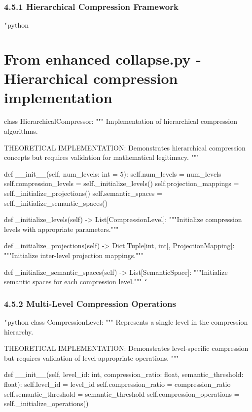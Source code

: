 \subsection{4.5.1 Hierarchical Compression Framework}

\texttt{`}python
\chapter{From enhanced collapse.py - Hierarchical compression implementation}
class HierarchicalCompressor:
    """
    Implementation of hierarchical compression algorithms.
    
    THEORETICAL IMPLEMENTATION: Demonstrates hierarchical compression
    concepts but requires validation for mathematical legitimacy.
    """
    
    def __init__(self, num_levels: int = 5):
        self.num_levels = num_levels
        self.compression_levels = self._initialize_levels()
        self.projection_mappings = self._initialize_projections()
        self.semantic_spaces = self._initialize_semantic_spaces()
        
    def _initialize_levels(self) -> List[CompressionLevel]:
        """Initialize compression levels with appropriate parameters."""
        
    def _initialize_projections(self) -> Dict[Tuple[int, int], ProjectionMapping]:
        """Initialize inter-level projection mappings."""
        
    def _initialize_semantic_spaces(self) -> List[SemanticSpace]:
        """Initialize semantic spaces for each compression level."""
\texttt{`}

\subsection{4.5.2 Multi-Level Compression Operations}

\texttt{`}python
class CompressionLevel:
    """
    Represents a single level in the compression hierarchy.
    
    THEORETICAL IMPLEMENTATION: Demonstrates level-specific compression
    but requires validation of level-appropriate operations.
    """
    
    def __init__(self, level_id: int, compression_ratio: float, semantic_threshold: float):
        self.level_id = level_id
        self.compression_ratio = compression_ratio
        self.semantic_threshold = semantic_threshold
        self.compression_operations = self._initialize_operations()
        
